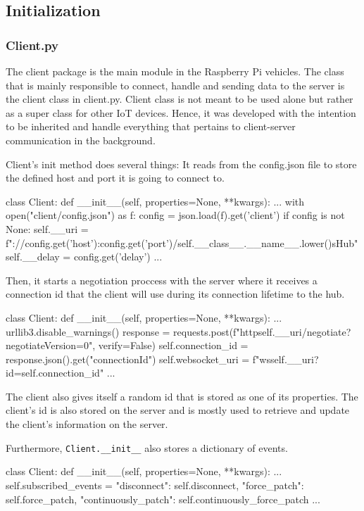 \subsection{Initialization}\label{initialization}
\subsubsection{Client.py}
The client package is the main module in the Raspberry Pi vehicles. The class that is mainly responsible to connect, handle and sending data to the server is the client class in client.py. Client class is not meant to be used alone but rather as a super class for other IoT devices. Hence, it was developed with the intention to be inherited and handle everything that pertains to client-server communication in the background.

Client's init method does several things: It reads from the config.json file to store the defined host and port it is going to connect to.
\begin{python}
class Client:
	def __init__(self, properties=None, **kwargs):
		...
		with open("client/config.json") as f:
			config = json.load(f).get('client')
			if config is not None:
				self.__uri = f"://{config.get('host')}:{config.get('port')}/{self.__class__.__name__.lower()}sHub"
				self.__delay = config.get('delay')
		...
\end{python}

Then, it starts a negotiation proccess with the server where it receives a connection id that the client will use during its connection lifetime to the hub.

\begin{python}
class Client:
	def __init__(self, properties=None, **kwargs):
		...
		urllib3.disable_warnings()
		response = requests.post(f"http{self.__uri}/negotiate?negotiateVersion=0", verify=False)
		self.connection_id = response.json().get("connectionId")
		self.websocket_uri = f"ws{self.__uri}?id={self.connection_id}"
		...
\end{python}

The client also gives itself a random id that is stored as one of its properties. The client's id is also stored on the server and is mostly used to retrieve and update the client's information on the server.

Furthermore, \verb|Client.__init__| also stores a dictionary of events.
\begin{python}
class Client:
	def __init__(self, properties=None, **kwargs):
		...
		self.subscribed_events = {
			"disconnect": self.disconnect,
			"force_patch": self.force_patch,
			"continuously_patch": self.continuously_force_patch
		}
		...
\end{python}

